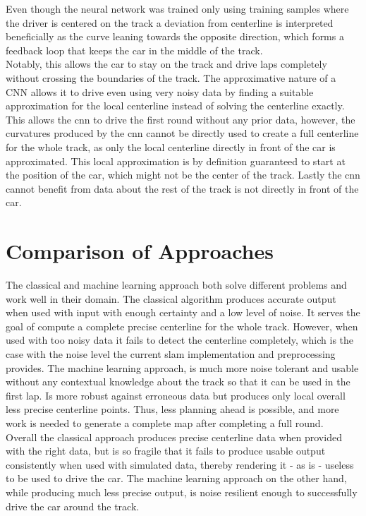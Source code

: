Even though the neural network was trained only using training samples where the driver is centered on the track a deviation from centerline is interpreted beneficially as the curve leaning towards the opposite direction, which forms a feedback loop that keeps the car in the middle of the track.\\
Notably, this allows the car to stay on the track and drive laps completely without crossing the boundaries of the track. The approximative nature of a CNN allows it to drive even using very noisy data by finding a suitable approximation for the local centerline instead of solving the centerline exactly. This allows the \ac{cnn} to drive the first round without any prior data, however, the curvatures produced by the \ac{cnn} cannot be directly used to create a full centerline for the whole track, as only the local centerline directly in front of the car is approximated. This local approximation is by definition guaranteed to start at the position of the car, which might not be the center of the track. Lastly the \ac{cnn} cannot benefit from data about the rest of the track is not directly in front of the car.



\section{Comparison of Approaches}

The classical and machine learning approach both solve different problems and work well in their domain. The classical algorithm produces accurate output when used with input with enough certainty and a low level of noise. It serves the goal of compute a complete precise centerline for the whole track. However, when used with too noisy data it fails to detect the centerline completely, which is the case with the noise level the current slam implementation and preprocessing provides. The machine learning approach, is much more noise tolerant and usable without any contextual knowledge about the track so that it can be used in the first lap. Is more robust against erroneous data but produces only local overall less precise centerline points. Thus, less planning ahead is possible, and more work is needed to generate a complete map after completing a full round.\\
Overall the classical approach produces precise centerline data when provided with the right data, but is so fragile that it fails to produce usable output consistently when used with simulated data, thereby rendering it - as is - useless to be used to drive the car. The machine learning approach on the other hand, while producing much less precise output, is noise resilient enough to successfully drive the car around the track.

